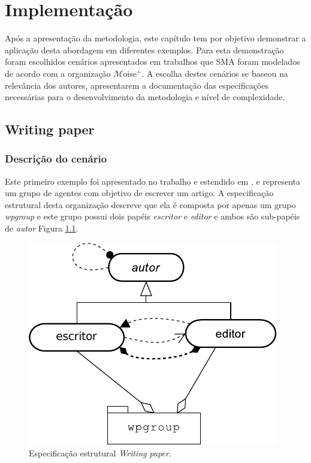 \chapter{Implementação}

Após a apresentação da metodologia, este capítulo tem por objetivo demonstrar a aplicação desta abordagem em diferentes exemplos. Para esta demonstração foram escolhidos cenários apresentados em trabalhos que SMA foram modelados de acordo com a organização $\mathcal{M}$oise$^{+}$. A escolha destes cenários se baseou na relevância dos autores, apresentarem a documentação das especificações necessárias para o desenvolvimento da metodologia e nível de complexidade.

\section{Writing paper}

\subsection{Descrição do cenário}

Este primeiro exemplo foi apresentado no trabalho \cite{kitio2008organisational} e estendido em \cite{hubner2011normative}, e representa um grupo de agentes com objetivo de escrever um artigo. A especificação estrutural desta organização descreve que ela é composta por apenas um grupo \textit{wpgroup} e este grupo possui dois papéis \textit{escritor} e \textit{editor} e ambos são sub-papéis de \textit{autor} Figura \ref{fig:writing-paper-estrutural}.
    
\begin{figure}[ht]
\centering
\includegraphics[scale=0.7]{imagens/5-writing-paper-estrutural.pdf}
\caption{Especificação estrutural \textit{Writing paper}. \cite{hubner2011normative}}
\label{fig:writing-paper-estrutural}
\end{figure}
    
